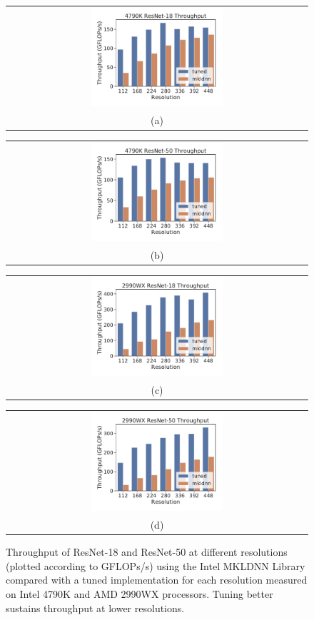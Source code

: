 \begin{figure}[t]
    \centering
    \begin{tabular}{@{}c@{}}
    \includegraphics[width=0.45\textwidth]{e2e_figures/4790K_perf_data_resnet18.pdf}\\
    \small (a)
    \end{tabular}
    \begin{tabular}{@{}c@{}}
    \includegraphics[width=0.45\textwidth]{e2e_figures/4790K_perf_data_resnet50.pdf}\\
    \small (b)
    \end{tabular}
    \begin{tabular}{@{}c@{}}
    \includegraphics[width=0.45\textwidth]{e2e_figures/2990WX_perf_data_resnet18.pdf}\\
    \small (c)
    \end{tabular}
    \begin{tabular}{@{}c@{}}
    \includegraphics[width=0.45\textwidth]{e2e_figures/2990WX_perf_data_resnet50.pdf}\\
    \small (d)
    \end{tabular}
    \caption{Throughput of ResNet-18 and ResNet-50 at different resolutions (plotted according to GFLOPs/s) using the Intel MKLDNN Library compared with a tuned implementation for each resolution measured on Intel 4790K and AMD 2990WX processors. Tuning better sustains throughput at lower resolutions.}
    \label{fig:tuning}
\end{figure}
